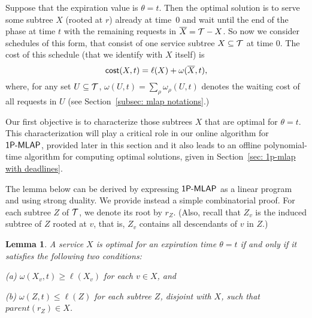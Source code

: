 \documentclass[a4paper]{article}
\newtheorem{lemma}[theorem]{Lemma}
\newcommand{\barX}{\overline{X}}
\newcommand{\calT}{{\cal T}}
\newcommand{\cost}{\mbox{\rm\textsf{cost}}}
\newcommand{\length}{\ell}
\newcommand{\parent}{\textit{parent}}
\newcommand{\SPMLAP}{\mbox{\rm\textsf{1P-MLAP}}}
\newcommand{\expiration}{\theta}
\begin{document}
Suppose that the expiration value is $\expiration = t$. Then the optimal solution is to serve some
subtree $X$ (rooted at $r$) already at time~0 and wait until the end of the phase at time $t$ with the remaining 
requests in $\barX = \calT - X$. 
So now we consider schedules of this form, that consist of one 
service subtree $X\subseteq \calT$ at time $0$.
The cost of this schedule (that we identify with $X$ itself) is
\begin{equation*}
	\cost(X,t) = \length(X) + \omega(\barX,t),
\end{equation*}
where, for any set $U\subseteq\calT$, $\omega(U,t) = \sum_{\rho}\omega_\rho(U,t)$
denotes the waiting cost of all requests in $U$ (see Section~\ref{subsec: mlap notations}.)

Our first objective
is to characterize those subtrees $X$ that are optimal for $\expiration= t$. 
This characterization will play a critical role in our online algorithm for
$\SPMLAP$, provided later in this section
and it also leads to an offline polynomial-time algorithm for computing optimal
solutions, given in Section~\ref{sec: 1p-mlap with deadlines}.

The lemma below 
can be derived by expressing $\SPMLAP$ as a linear program and using strong duality. We
provide instead a simple combinatorial proof. For each subtree $Z$ of $\calT$, we
denote its root by $r_Z$. (Also, recall that $Z_v$ is the induced
subtree of $Z$ rooted at $v$, that is, $Z_v$ contains all descendants of $v$ in $Z$.)


\begin{lemma}\label{lem: 1-phase optimal schedules}
A service $X$ is optimal for an expiration time $\expiration =t$ if and only if 
it satisfies the following two conditions:
\begin{description}
\item{{\rm (a)}} $\omega(X_v,t)\ge \length(X_v)$ for each $v\in X$, and
\item{{\rm (b)}} $\omega(Z,t)\le \length(Z)$ for each subtree $Z$, disjoint with $X$,
			such that  $\parent(r_Z) \in X$.
\end{description}
\end{lemma}
\end{document}
